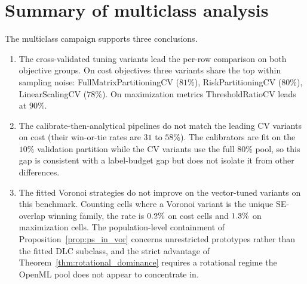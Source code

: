 



\section{Summary of multiclass analysis}

The multiclass campaign supports three conclusions.

\begin{enumerate}
    \item The cross-validated tuning variants lead the per-row comparison on both objective groups. On cost objectives three variants share the top within sampling noise: FullMatrixPartitioningCV ($81\%$), RiskPartitioningCV ($80\%$), LinearScalingCV ($78\%$). On maximization metrics ThresholdRatioCV leads at $90\%$.
    \item The calibrate-then-analytical pipelines do not match the leading CV variants on cost (their win-or-tie rates are $31$ to $58\%$). The calibrators are fit on the $10\%$ validation partition while the CV variants use the full $80\%$ pool, so this gap is consistent with a label-budget gap but does not isolate it from other differences.
    \item The fitted Voronoi strategies do not improve on the vector-tuned variants on this benchmark. Counting cells where a Voronoi variant is the unique SE-overlap winning family, the rate is $0.2\%$ on cost cells and $1.3\%$ on maximization cells. The population-level containment of Proposition~\ref{prop:ps_in_vor} concerns unrestricted prototypes rather than the fitted DLC subclass, and the strict advantage of Theorem~\ref{thm:rotational_dominance} requires a rotational regime the OpenML pool does not appear to concentrate in.
\end{enumerate}
